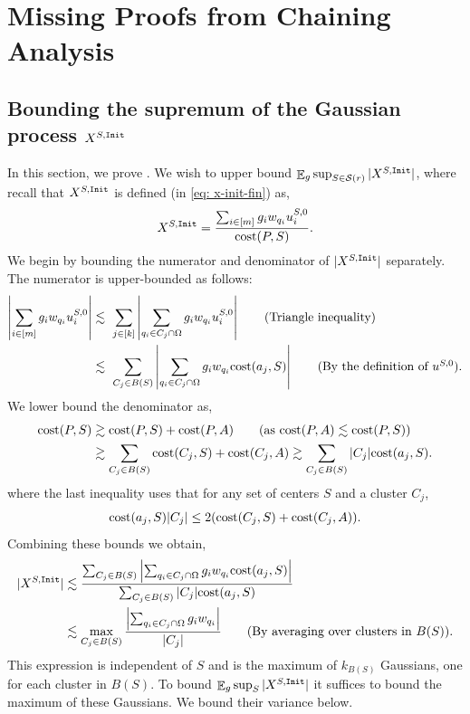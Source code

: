 \documentclass[11pt]{article}
\theoremstyle{restate}
\theoremstyle{definition}
\newcommand{\E}{\mathop{\mathbb{E}}}
\newcommand{\cost}{\textnormal{cost}}
\newcommand{\uq}[2]{u^{#1}_{#2}} %
\newcommand{\init}{\ensuremath{\textnormal{\texttt{Init}}}}
\newcommand{\inSR}{\in \mathcal{S}(r)}
\begin{document}
\section{Missing Proofs from Chaining Analysis}
\subsection{\texorpdfstring{Bounding the supremum of the Gaussian process $X^{S,\init}$}{Bounding the Supremum of X{S,Init}}}
\label{sec:lemXinit}
In this section, we prove  . We wish to upper bound $\E_g \sup_{S\inSR} |X^{S,\init}|$, where  recall that $X^{S,\init}$ is defined (in \eqref{eq: x-init-fin}) as,
\[
    X^{S,\init} = \frac{\sum_{i \in [m]} g_i w_{q_i} \uq{S,0}{i}}{\cost(P,S) }.
\]
We begin by bounding the numerator and denominator of $|X^{S,\init}|$ separately. The numerator is upper-bounded as follows:
\begin{align*}
    \left\lvert\sum_{i \in [m]}g_i w_{q_i} \uq{S,0}{i}\right\rvert
    &\lesssim \,\, \sum_{j \in [k]} \left\lvert\sum_{{q_i} \in C_j \cap \Omega}g_i w_{q_i} u^{S,0}_i\right\rvert \tag{Triangle inequality}\\
    &\lesssim \,\,\sum_{C_j \in B(S)} \left\lvert\sum_{{q_i} \in C_j \cap \Omega}g_i w_{q_i} \cost(a_j,S)\right\rvert \tag{By the  definition of $u^{S,0}$}.
\end{align*}
We lower bound the denominator as,
\begin{align*}
    \cost(P,S) &\gtrsim \cost(P,S) + \cost(P,A) \tag{as $\cost(P,A) \lesssim \cost(P,S)$}\\
    &\gtrsim \sum_{C_j \in B(S)} \cost(C_j,S) + \cost(C_j,A) \gtrsim \sum_{C_j \in B(S)} |C_j| \cost(a_j,S). 
\end{align*}
where the last inequality uses that for any set of centers $S$ and a cluster $C_j$,
\[
\cost(a_j, S) |C_j|\leq 2(\cost(C_j, S) + \cost(C_j,A)). 
\]
Combining these bounds we obtain, 
\begin{align*}
    |X^{S,\init}| 
    &\lesssim   \frac{\sum_{C_j \in B(S)} \left\lvert\sum_{{q_i} \in C_j \cap \Omega}g_i w_{q_i} \cost(a_j,S)\right\rvert}{\sum_{C_j \in B(S)} |C_j| \cost(a_j,S)} \\
    &\lesssim \max_{C_j \in B(S)}  \frac{\left\lvert\sum_{q_i \in C_j \cap \Omega}g_i w_{q_i} \right\rvert}{|C_j|} \tag{By averaging over clusters in $B(S)$}.
\end{align*}
This expression is independent of $S$ and is the maximum of $k_{B(S)}$ Gaussians, one for each cluster in $B(S)$. To bound $\E_g \sup_S |X^{S,\init}|$ it suffices to bound the maximum of these Gaussians. We bound their variance below.
\end{document}
